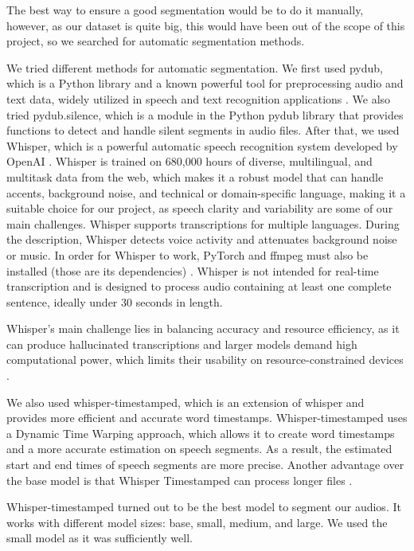 \documentclass[a4paper]{article}
\begin{document}
	The best way to ensure a good segmentation would be to do it manually, however, as our dataset is quite big, this would have been out of the scope of this project, so we searched for automatic segmentation methods.
	
	We tried different methods for automatic segmentation. We first used pydub, which is a Python library and a known powerful tool for preprocessing audio and text data, widely utilized in speech and text recognition applications \cite{Kulkarni2023}. We also tried pydub.silence, which is a module in the Python pydub library that provides functions to detect and handle silent segments in audio files. After that, we used Whisper, which is a powerful automatic speech recognition system developed by OpenAI \cite{OpenAI2022}. Whisper is trained on 680,000 hours of diverse, multilingual, and multitask data from the web, which makes it a robust model that can handle accents, background noise, and technical or domain-specific language, making it a suitable choice for our project, as speech clarity and variability are some of our main challenges. Whisper supports transcriptions for multiple languages. During the description, Whisper detects voice activity and attenuates background noise or music. In order for Whisper to work, PyTorch and ffmpeg must also be installed (those are its dependencies) \cite{Andreyev2025}. Whisper is not intended for real-time transcription and is designed to process audio containing at least one complete sentence, ideally under 30 seconds in length.
	
	Whisper's main challenge lies in balancing accuracy and resource efficiency, as it can produce hallucinated transcriptions and larger models demand high computational power, which limits their usability on resource-constrained devices \cite{Andreyev2025}.
	
	We also used whisper-timestamped, which is an extension of whisper and provides more efficient and accurate word timestamps. Whisper-timestamped uses a Dynamic Time Warping approach, which allows it to create word timestamps and a more accurate estimation on speech segments. As a result, the estimated start and end times of speech segments are more precise. Another advantage over the base model is that Whisper Timestamped can process longer files \cite{Andreyev2025}.
	
	Whisper-timestamped turned out to be the best model to segment our audios. It works with different model sizes: base, small, medium, and large. We used the small model as it was sufficiently well.
	
\end{document}
